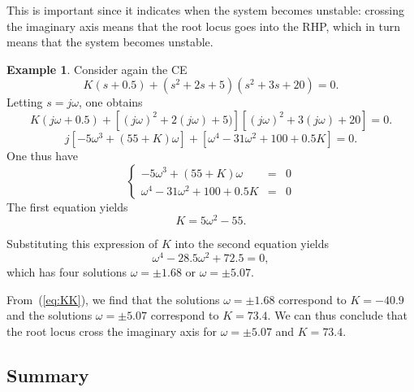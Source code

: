 \documentclass[a4paper,11pt]{report}
\theoremstyle{definition}
\newtheorem{mdexample}{Example}
\newenvironment{example}%
  {\vspace{0.1cm}\begin{mdframed}[backgroundcolor=lightgray]\begin{mdexample}}%
  {\end{mdexample}\end{mdframed}\vspace{0.1cm}}
\begin{document}
This is important since it indicates when the system becomes unstable:
crossing the imaginary axis means that the root locus goes into the
RHP, which in turn means that the system becomes unstable.

\begin{example}
  Consider again the CE
  \[
  K(s+0.5) + (s^2+2s+5)(s^2+3s+20) = 0.
  \]
  Letting $s=j\omega$, one obtains
  \[
  K(j\omega+0.5) + [(j\omega)^2+2(j\omega)+5)][(j\omega)^2+3(j\omega)+20] = 0.
  \]
  \[
  j[-5\omega^3+(55+K)\omega] + [\omega^4-31\omega^2+100+0.5K] = 0.
  \]
  One thus have
  \[
  \left\{
  \begin{array}{lcr}
    -5\omega^3+(55+K)\omega &=& 0 \\
    \omega^4-31\omega^2+100+0.5K  &=& 0
  \end{array}
  \right.
  \]
  The first equation yields
  \begin{equation}
    \label{eq:KK}
    K = 5\omega^2-55.
  \end{equation}
  
  Substituting this expression of $K$ into the second equation yields
  \[
  \omega^4-28.5\omega^2+72.5=0,
  \]
  which has four solutions $\omega=\pm 1.68$ or $\omega=\pm 5.07$.
  
  From~(\ref{eq:KK}), we find that the solutions $\omega=\pm 1.68$
  correspond to $K=-40.9$ and the solutions $\omega=\pm 5.07$
  correspond to $K=73.4$. We can thus conclude that the root locus
  cross the imaginary axis for $\omega=\pm 5.07$ and $K=73.4$.
\end{example}


\subsection{Summary}
\end{document}
